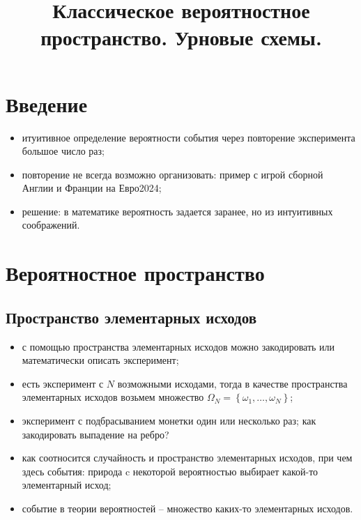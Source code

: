 

\title{Классическое вероятностное пространство. Урновые схемы.} 
\date{\vspace{-1cm}}


\maketitle

\section*{Введение}
\begin{itemize}
    \item
    итуитивное определение вероятности события через повторение эксперимента большое число раз;
    \item
    повторение не всегда возможно организовать: пример с игрой сборной Англии и Франции на Евро2024;
    \item
    решение: в математике вероятность задается заранее, но из интуитивных соображений.
\end{itemize}

\section*{Вероятностное пространство}
\subsection*{Пространство элементарных исходов}
\begin{itemize}
    \item
    с помощью пространства элементарных исходов можно закодировать или математически описать эксперимент;
    \item
    есть эксперимент с $N$ возможными исходами, тогда в качестве пространства элементарных исходов возьмем множество $\Omega_N = \left\{\omega_1, \ldots, \omega_N\right\}$;
    \item
    эксперимент с подбрасыванием монетки один или несколько раз;
    как закодировать выпадение на ребро?
    \item
    как соотносится случайность и пространство элементарных исходов, при чем здесь события: природа c некоторой вероятностью выбирает какой-то элементарный исход;
    \item
    событие в теории вероятностей -- множество каких-то элементарных исходов.
\end{itemize}

